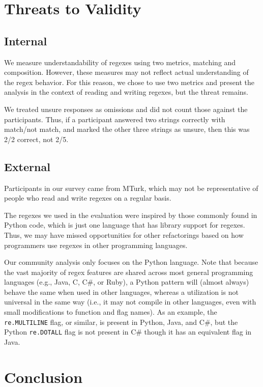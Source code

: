 \section{Threats to Validity}

\subsection{Internal}
We measure understandability of regexes using two metrics, matching and composition. However, these measures may not reflect actual understanding of the regex behavior. For this reason, we chose to use two metrics and present the analysis in the context of reading and writing regexes, but the threat remains.


We treated unsure responses as omissions and did not count those against the participants. Thus, if a participant answered two strings correctly with match/not match, and marked the other three strings as unsure, then this was 2/2 correct, not 2/5. 

\subsection{External}
Participants in our survey came from MTurk, which may not be representative of people who read and write regexes on a regular basis.

The regexes we used in the evaluation were inspired by those commonly found in Python code, which is just one language that has library support for regexes. Thus, we may have missed opportunities for other refactorings based on how programmers use regexes in other programming languages.

Our community analysis only focuses on the Python language. Note that because the vast majority of regex features are shared across most general programming languages (e.g., Java, C, C\#, or Ruby), a Python {pattern} will (almost always) behave the same when used in other languages, whereas a utilization is not universal in the same way (i.e., it may not compile in other languages, even with small modifications to function and flag names).
As an example, the {\tt re.MULTILINE} flag, or similar, is present in Python, Java, and C\#, but  the Python {\tt re.DOTALL} flag is not present in C\# though it has an equivalent flag in Java.

\section{Conclusion}
